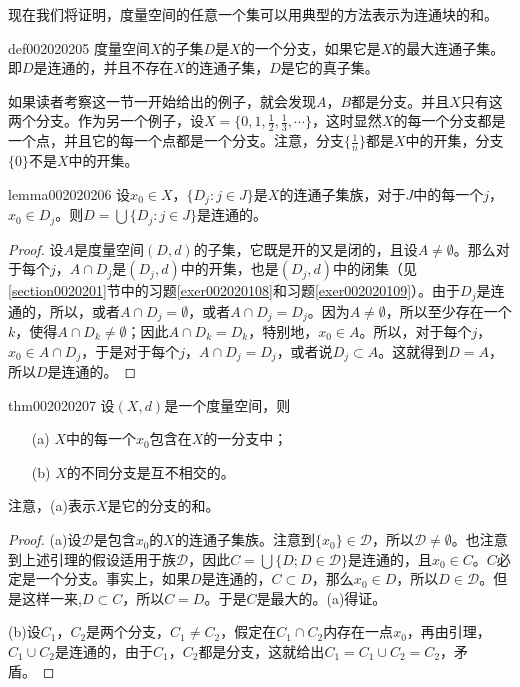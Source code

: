 现在我们将证明，度量空间的任意一个集可以用典型的方法表示为连通块的和。

\begin{definition}{}{def002020205}
度量空间$X$的子集$D$是$X$的一个分支，如果它是$X$的最大连通子集。即$D$是连通的，并且不存在$X$的连通子集，$D$是它的真子集。
\end{definition}

如果读者考察这一节一开始给出的例子，就会发现$A$，$B$都是分支。并且$X$只有这两个分支。作为另一个例子，设$X = \{0, 1, \frac{1}{2},\frac{1}{3}, \cdots\}$，这时显然$X$的每一个分支都是一个点，并且它的每一个点都是一个分支。注意，分支$\{\frac{1}{n}\}$都是$X$中的开集，分支$\{0\}$不是$X$中的开集。

\begin{lemma}{}{lemma002020206}
设$x_0 \in X$，$\{D_j : j \in J\}$是$X$的连通子集族，对于$J$中的每一个$j$，$x_0 \in D_j$。则$D = \bigcup{\{D_j : j \in J\}}$是连通的。
\end{lemma}

\begin{proof}
设$A$是度量空间$(D, d)$的子集，它既是开的又是闭的，且设$A \neq \emptyset$。那么对于每个$j$，$A \cap D_j$是$(D_j, d)$中的开集，也是$(D_j, d)$中的闭集（见\ref{section0020201}节中的习题\ref{exer002020108}和习题\ref{exer002020109}）。由于$D_j$是连通的，所以，或者$A \cap D_j = \emptyset$，或者$A \cap D_j = D_j$。因为$A \neq \emptyset$，所以至少存在一个$k$，使得$A \cap D_k \neq \emptyset$；因此$A \cap D_k = D_k$，特别地，$x_0 \in A$。所以，对于每个$j$，$x_0 \in A \cap D_j$，于是对于每个$j$，$A \cap D_j = D_j$，或者说$D_j \subset A$。这就得到$D = A$，所以$D$是连通的。
\end{proof}

\begin{theorem}{}{thm002020207}
设$(X, d)$是一个度量空间，则
\begin{enumerate}
\item[(a)]$X$中的每一个$x_0$包含在$X$的一分支中；
\item[(b)]$X$的不同分支是互不相交的。
\end{enumerate}
\end{theorem}

注意，(a)表示$X$是它的分支的和。

\begin{proof}
(a)设$\mathscr{D}$是包含$x_0$的$X$的连通子集族。注意到$\{x_0\} \in \mathscr{D}$，所以$\mathscr{D} \neq \emptyset$。也注意到上述引理的假设适用于族$\mathscr{D}$，因此$C = \bigcup\{D; D \in \mathscr{D}\}$是连通的，且$x_0 \in C$。$C$必定是一个分支。事实上，如果$D$是连通的，$C \subset D$，那么$x_0 \in D$，所以$D \in \mathscr{D}$。但是这样一来,$D \subset C$，所以$C=D$。于是$C$是最大的。(a)得证。

(b)设$C_1$，$C_2$是两个分支，$C_1 \neq C_2$，假定在$C_1 \cap C_2$内存在一点$x_0$，再由引理，$C_1 \cup C_2$是连通的，由于$C_1$，$C_2$都是分支，这就给出$C_1 = C_1 \cup C_2 = C_2$，矛盾。
\end{proof}

